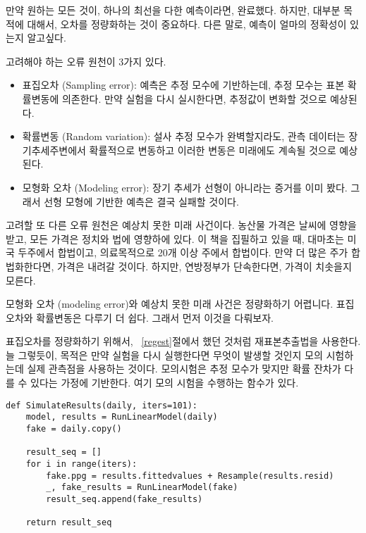 만약 원하는 모든 것이, 하나의 최선을 다한 예측이라면, 완료했다.
하지만, 대부분 목적에 대해서, 오차를 정량화하는 것이 중요하다.
다른 말로, 예측이 얼마의 정확성이 있는지 알고싶다.

고려해야 하는 오류 원천이 3가지 있다.

\begin{itemize}

\item 표집오차 (Sampling error): 
예측은 추정 모수에 기반하는데, 추정 모수는 표본 확률변동에 의존한다.
만약 실험을 다시 실시한다면, 추정값이 변화할 것으로 예상된다.

\item 확률변동 (Random variation):
설사 추정 모수가 완벽할지라도, 관측 데이터는 장기추세주변에서 확률적으로 변동하고 이러한 변동은 미래에도 계속될 것으로 예상된다.

\item 모형화 오차 (Modeling error): 
장기 추세가 선형이 아니라는 증거를 이미 봤다. 그래서 선형 모형에 기반한 예측은 결국 실패할 것이다.

\end{itemize}

고려할 또 다른 오류 원천은 예상치 못한 미래 사건이다. 
농산물 가격은 날씨에 영향을 받고, 모든 가격은 정치와 법에 영향하에 있다. 이 책을 집필하고 있을 때, 대마초는 미국 두주에서 합법이고, 의료목적으로 20개 이상 주에서 합법이다. 만약 더 많은 주가 합법화한다면, 가격은 내려갈 것이다. 하지만, 연방정부가 단속한다면, 가격이 치솟을지 모른다.

모형화 오차 (modeling error)와 예상치 못한 미래 사건은 정량화하기 어렵니다. 표집오차와 확률변동은 다루기 더 쉽다. 그래서 먼저 이것을 다뤄보자.

표집오차를 정량화하기 위해서, ~\ref{regest}절에서 했던 것처럼 재표본추출법을 사용한다. 늘 그렇듯이, 목적은 만약 실험을 다시 실행한다면 무엇이 발생할 것인지 모의 시험하는데 실제 관측점을 사용하는 것이다.
모의시험은 추정 모수가 맞지만 확률 잔차가 다를 수 있다는 가정에 기반한다.
여기 모의 시험을 수행하는 함수가 있다.

\begin{verbatim}
def SimulateResults(daily, iters=101):
    model, results = RunLinearModel(daily)
    fake = daily.copy()
    
    result_seq = []
    for i in range(iters):
        fake.ppg = results.fittedvalues + Resample(results.resid)
        _, fake_results = RunLinearModel(fake)
        result_seq.append(fake_results)

    return result_seq
\end{verbatim}

